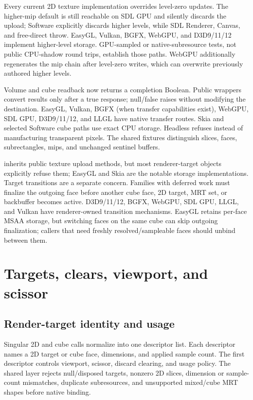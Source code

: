 Every current 2D texture implementation overrides level-zero updates. The higher-mip default is
still reachable on SDL GPU and silently discards the upload; Software explicitly discards higher
levels, while SDL Renderer, Canvas, and free-direct throw. EasyGL, Vulkan, BGFX, WebGPU, and
D3D9/11/12 implement higher-level storage. GPU-sampled or native-subresource tests, not public
CPU-shadow round trips, establish those paths. WebGPU additionally regenerates the mip chain
after level-zero writes, which can overwrite previously authored higher levels.

\label{sec:texture-volume-readback-matrix}
Volume and cube readback now returns a completion Boolean. Public wrappers convert results only
after a true response; null/false raises  without modifying the
destination. EasyGL, Vulkan, BGFX (when transfer capabilities exist), WebGPU, SDL GPU,
D3D9/11/12, and LLGL have native transfer routes. Skia and selected Software cube paths use exact
CPU storage. Headless refuses instead of manufacturing transparent pixels. The shared fixtures
distinguish slices, faces, subrectangles, mips, and unchanged sentinel buffers.

\label{sec:rendertargetcube-default-contracts}
 inherits public texture upload methods, but most renderer-target
objects explicitly refuse them; EasyGL and Skia are the notable storage implementations.
Target transitions are a separate concern. Families with deferred work must finalize the
outgoing face before another cube face, 2D target, MRT set, or backbuffer becomes active.
D3D9/11/12, BGFX, WebGPU, SDL GPU, LLGL, and Vulkan have renderer-owned transition mechanisms.
EasyGL retains per-face MSAA storage, but switching faces on the same cube can skip outgoing
finalization; callers that need freshly resolved/sampleable faces should unbind between them.

\section{Targets, clears, viewport, and scissor}

\subsection{Render-target identity and usage}
\label{sec:backend-rendertarget-usage-matrix}

Singular 2D and cube calls normalize into one descriptor list. Each descriptor names a 2D target
or cube face, dimensions, and applied sample count. The first descriptor controls viewport,
scissor, discard clearing, and usage policy. The shared layer rejects null/disposed targets,
nonzero 2D slices, dimension or sample-count mismatches, duplicate subresources, and unsupported
mixed/cube MRT shapes before native binding.

